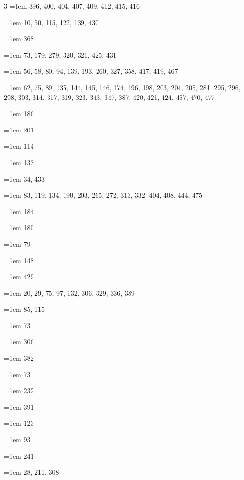 \begin{multicols}{3}
\hangindent=1em  396, 400, 404, 407, 409, 412, 415, 416\par
\hangindent=1em  10, 50, 115, 122, 139, 430\par
\hangindent=1em  368\par
\hangindent=1em  73, 179, 279, 320, 321, 425, 431\par
\hangindent=1em  56, 58, 80, 94, 139, 193, 260, 327, 358, 417, 419, 467\par
\hangindent=1em  62, 75, 89, 135, 144, 145, 146, 174, 196, 198, 203, 204, 205, 281, 295, 296, 298, 303, 314, 317, 319, 323, 343, 347, 387, 420, 421, 424, 457, 470, 477\par
\hangindent=1em  186\par
\hangindent=1em  201\par
\hangindent=1em  114\par
\hangindent=1em  133\par
\hangindent=1em  34, 433\par
\hangindent=1em  83, 119, 134, 190, 203, 265, 272, 313, 332, 404, 408, 444, 475\par
\hangindent=1em  184\par
\hangindent=1em  180\par
\hangindent=1em  79\par
\hangindent=1em  148\par
\hangindent=1em  429\par
\hangindent=1em  20, 29, 75, 97, 132, 306, 329, 336, 389\par
\hangindent=1em  85, 115\par
\hangindent=1em  73\par
\hangindent=1em  306\par
\hangindent=1em  382\par
\hangindent=1em  73\par
\hangindent=1em  232\par
\hangindent=1em  391\par
\hangindent=1em  123\par
\hangindent=1em  93\par
\hangindent=1em  241\par
\hangindent=1em  28, 211, 308\par

\end{multicols}
